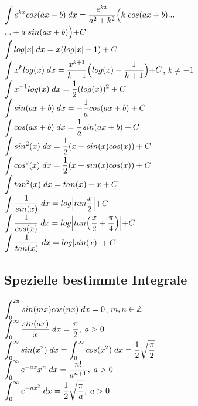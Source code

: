 $\mathlarger{\int e^{kx}cos(ax+b)\;dx=\frac{e^{kx}}{a^2 + k^2}\Bigl(k\;cos(ax+b)...}$\\
$\mathlarger{...+a\;sin(ax+b)\Bigl)+C}$\\
$\mathlarger{\int log|x|\;dx= x(log|x|-1)+C}$\\
$\mathlarger{\int x^k log(x)\;dx=\frac{x^{k+1}}{k+1}\Bigl(log(x)-\frac{1}{k+1}\Bigl)+C}$, $k\neq -1$\\
$\mathlarger{\int x^{-1}log(x)\;dx= \frac{1}{2}(log(x))^2 + C}$\\
$\mathlarger{\int sin(ax+b)\;dx=-\frac{1}{a}cos(ax+b)+C}$\\
$\mathlarger{\int cos(ax+b)\;dx=\frac{1}{a}sin(ax+b)+C}$\\
$\mathlarger{\int sin^2(x)\;dx= \frac{1}{2}(x-sin(x)cos(x))+C}$\\
$\mathlarger{\int cos^2(x)\;dx= \frac{1}{2}(x+sin(x)cos(x))+C}$\\
$\mathlarger{\int tan^2(x)\;dx= tan(x)-x+C}$\\
$\mathlarger{\int \frac{1}{sin(x)}\;dx=log\Bigl|tan\frac{x}{2}\Bigl|+C}$\\
$\mathlarger{\int \frac{1}{cos(x)}\;dx=log\Bigl|tan\Bigl(\frac{x}{2}+\frac{\pi}{4}\Bigl)\Bigl|+C}$\\
$\mathlarger{\int \frac{1}{tan(x)}\;dx=log|sin(x)|+C}$\\


\subsection{Spezielle bestimmte Integrale}
$\mathlarger{\int_0^{2\pi} sin(mx)cos(nx)\;dx=0}$, $m,n\in \mathbb{Z}$\\
$\mathlarger{\int_0^\infty \frac{sin(ax)}{x}\;dx=\frac{\pi}{2},\;a>0}$\\
$\mathlarger{\int_0^\infty sin(x^2)\;dx=\int_0^\infty cos(x^2)\;dx=\frac{1}{2}\sqrt{\frac{\pi}{2}}}$\\
$\mathlarger{\int_0^\infty e^{-ax}x^n\;dx= \frac{n!}{a^{n+1}},\;a>0}$\\
$\mathlarger{\int_0^\infty e^{-ax^2}\;dx=\frac{1}{2}\sqrt{\frac{\pi}{a}},\;a>0}$\\
